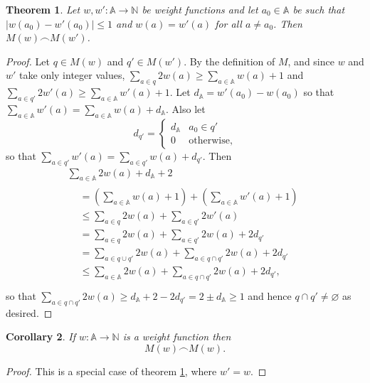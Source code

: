 \documentclass[journal]{IEEEtran}
\newtheorem{theorem}{Theorem}
\newtheorem{corollary}[theorem]{Corollary}
\begin{document}
\begin{theorem} \label{weights-nearly-equal} Let $w, w' : \mathbb A \to \mathbb
N$ be weight functions and let $a_0 \in \mathbb A$ be such that $|w(a_0) -
w'(a_0)| \le 1$ and $w(a) = w'(a)$ for all $a \ne a_0$. Then $M(w) \frown
M(w')$.  \end{theorem}

\begin{proof} Let $q \in M(w)$ and $q' \in M(w')$. By the
  definition of $M$, and since $w$ and $w'$ take only integer values,
%
$\sum_{a \in q} 2 w(a) \ge \sum_{a \in \mathbb A} w(a) + 1$
%
and
%
$\sum_{a \in q'} 2 w'(a) \ge \sum_{a \in \mathbb A} w'(a) + 1$.
%
Let $d_{\mathbb A} = w'(a_0) - w(a_0)$ so that $\sum_{a \in \mathbb A} w'(a) =
\sum_{a \in \mathbb A} w(a) + d_{\mathbb A}$. Also let \[
d_{q'} =
\begin{cases}
%
d_{\mathbb A} & a_0 \in q' \\
%
0 & \textrm{otherwise,}
%
\end{cases}
\]
so that $\sum_{a \in q'} w'(a) = \sum_{a \in q'} w(a) + d_{q'}$.
%
Then
\begin{gather*}
%
\sum_{a \in \mathbb A} 2w(a) + d_{\mathbb A} + 2 \\
%
\begin{aligned}
%
&= \left( \sum_{a \in \mathbb A} w(a)  + 1\right)
+  \left( \sum_{a \in \mathbb A} w'(a) + 1\right) \\
%
&\le \sum_{a \in q}  2w(a)
+    \sum_{a \in q'} 2w'(a) \\
%
&= \sum_{a \in q}  2w(a)
+  \sum_{a \in q'} 2w(a) + 2d_{q'}\\
%
&= \sum_{a \in q \cup q'} 2w(a)
+  \sum_{a \in q \cap q'} 2w(a) + 2d_{q'}\\
%
&\le \sum_{a \in \mathbb A} 2w(a)
+    \sum_{a \in q \cap q'} 2w(a) + 2d_{q'},\\
%
\end{aligned}\end{gather*} so that $\sum_{a \in q \cap q'} 2w(a) \ge d_{\mathbb
A} + 2 - 2d_{q'} = 2 \pm d_\mathbb A \ge 1$ and hence $q \cap q' \ne \varnothing$ as desired.
\end{proof}

\begin{corollary} \label{weights-equal} If $w : \mathbb A \to \mathbb N$ is a
weight function then \[M(w) \frown M(w).\]  \end{corollary}

\begin{proof}
This is a special case of theorem \ref{weights-nearly-equal}, where $w' = w$.
\end{proof}
\end{document}
